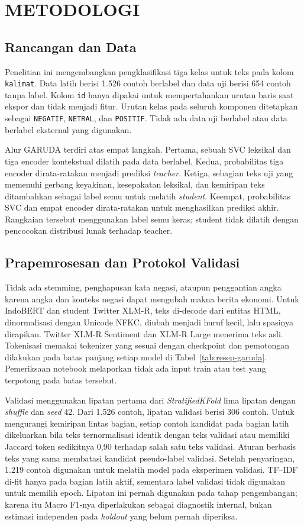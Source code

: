 \section{METODOLOGI}

\subsection{Rancangan dan Data}
Penelitian ini mengembangkan pengklasifikasi tiga kelas untuk teks pada kolom
\texttt{kalimat}. Data latih berisi 1.526 contoh berlabel dan data uji berisi
654 contoh tanpa label. Kolom \texttt{id} hanya dipakai untuk mempertahankan
urutan baris saat ekspor dan tidak menjadi fitur. Urutan kelas pada seluruh
komponen ditetapkan sebagai \texttt{NEGATIF}, \texttt{NETRAL}, dan
\texttt{POSITIF}. Tidak ada data uji berlabel atau data berlabel eksternal
yang digunakan.

Alur GARUDA terdiri atas empat langkah. Pertama, sebuah SVC leksikal dan tiga
encoder kontekstual dilatih pada data berlabel. Kedua, probabilitas tiga
encoder dirata-ratakan menjadi prediksi \textit{teacher}. Ketiga, sebagian
teks uji yang memenuhi gerbang keyakinan, kesepakatan leksikal, dan kemiripan
teks ditambahkan sebagai label semu untuk melatih \textit{student}. Keempat,
probabilitas SVC dan empat encoder dirata-ratakan untuk menghasilkan prediksi
akhir. Rangkaian tersebut menggunakan label semu keras; student tidak dilatih
dengan pencocokan distribusi lunak terhadap teacher.

\subsection{Prapemrosesan dan Protokol Validasi}
Tidak ada stemming, penghapusan kata negasi, ataupun penggantian angka karena
angka dan konteks negasi dapat mengubah makna berita ekonomi. Untuk IndoBERT
dan student Twitter XLM-R, teks di-decode dari entitas HTML, dinormalisasi
dengan Unicode NFKC, diubah menjadi huruf kecil, lalu spasinya dirapikan.
Twitter XLM-R Sentiment dan XLM-R Large menerima teks asli. Tokenisasi memakai
tokenizer yang sesuai dengan checkpoint dan pemotongan dilakukan pada batas
panjang setiap model di Tabel~\ref{tab:resep-garuda}. Pemeriksaan notebook
melaporkan tidak ada input train atau test yang terpotong pada batas tersebut.

Validasi menggunakan lipatan pertama dari \textit{StratifiedKFold} lima
lipatan dengan \textit{shuffle} dan \textit{seed} 42. Dari 1.526 contoh,
lipatan validasi berisi 306 contoh. Untuk mengurangi kemiripan lintas bagian,
setiap contoh kandidat pada bagian latih dikeluarkan bila teks ternormalisasi
identik dengan teks validasi atau memiliki Jaccard token sedikitnya 0,90
terhadap salah satu teks validasi. Aturan berbasis teks yang sama membatasi
kandidat pseudo-label validasi. Setelah penyaringan, 1.219 contoh digunakan
untuk melatih model pada eksperimen validasi. TF--IDF di-fit hanya pada bagian
latih aktif, sementara label validasi tidak digunakan untuk memilih epoch.
Lipatan ini pernah digunakan pada tahap pengembangan; karena itu Macro F1-nya
diperlakukan sebagai diagnostik internal, bukan estimasi independen pada
\textit{holdout} yang belum pernah diperiksa.

